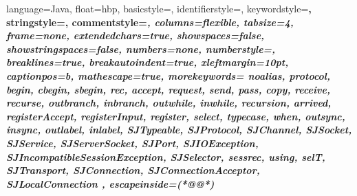 \newcommand{\ARG}[1]{{\rm\em #1}}

\newcommand{\CODESIZE}{\small} %
\newcommand{\LISTINGSIZE}{\fontsize{8}{10}\selectfont} %
\newcommand{\CODE}[1]{\texttt{\CODESIZE #1}} %
\newcommand{\LST}[1]{\lstinline@#1@} %

\newcommand{\OPIN}[2]{\ensuremath{\CODE{#1}(#2)}} %
\newcommand{\OPOUT}[2]{\ensuremath{\CODE{#1}\langle #2 \rangle}} %
\newcommand{\PARTY}[1]{\ensuremath{\textbf{#1}}} %

\newcommand{\LISTINGSTYLE}{\ttfamily\LISTINGSIZE}

\lstset
{
	language=Java,
	float=hbp,
	basicstyle=\ttfamily\CODESIZE, %
	identifierstyle=\color{Black},
	keywordstyle=\bfseries\color{blue},
	stringstyle=\color{Violet},
	commentstyle=\itshape\color{RedViolet},
	columns=flexible,
	tabsize=4,
	frame=none,
	extendedchars=true,
	showspaces=false,
	showstringspaces=false,
	numbers=none,
	numberstyle=\tiny,
	breaklines=true,
	breakautoindent=true,
	xleftmargin=10pt,
	captionpos=b,
	mathescape=true,
	morekeywords=
	{	
		noalias,
		protocol, begin, cbegin, sbegin, rec,
		accept,
		request, send, pass, copy, receive, recurse, 
		outbranch, inbranch, outwhile, inwhile, recursion, 
		arrived, registerAccept, registerInput, register, select, 
		typecase, when, 
		outsync, insync, outlabel, inlabel, 
		SJTypeable, SJProtocol, SJChannel, SJSocket, SJService, SJServerSocket, SJPort, 
		SJIOException, SJIncompatibleSessionException, 
		SJSelector,  
		sessrec, 
		using,
                selT,
		SJTransport,  SJConnection,  SJConnectionAcceptor,  SJLocalConnection
	},
	escapeinside={(*@}{@*)}
}



